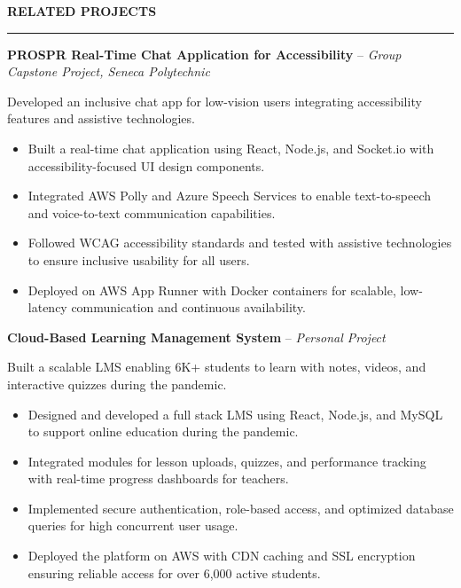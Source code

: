 \documentclass[10pt,letterpaper]{article}
\begin{document}
\vspace{6pt}

\textbf{RELATED PROJECTS}\\[-8pt]
\noindent\rule{\textwidth}{1pt}

\vspace{-2pt}

\textbf{PROSPR  Real-Time Chat Application for Accessibility} -- \emph{Group Capstone Project, Seneca Polytechnic}

\vspace{-1pt}

Developed an inclusive chat app for low-vision users integrating accessibility features and assistive technologies.
\vspace{-1pt}
\begin{itemize}
\item Built a real-time chat application using React, Node.js, and Socket.io with accessibility-focused UI design components.
\item Integrated AWS Polly and Azure Speech Services to enable text-to-speech and voice-to-text communication capabilities.
\item Followed WCAG accessibility standards and tested with assistive technologies to ensure inclusive usability for all users.
\item Deployed on AWS App Runner with Docker containers for scalable, low-latency communication and continuous availability.
\end{itemize}

\textbf{Cloud-Based Learning Management System} -- \emph{Personal Project}

\vspace{-1pt}

Built a scalable LMS enabling 6K+ students to learn with notes, videos, and interactive quizzes during the pandemic.
\vspace{-1pt}
\begin{itemize}
\item Designed and developed a full stack LMS using React, Node.js, and MySQL to support online education during the pandemic.
\item Integrated modules for lesson uploads, quizzes, and performance tracking with real-time progress dashboards for teachers.
\item Implemented secure authentication, role-based access, and optimized database queries for high concurrent user usage.
\item Deployed the platform on AWS with CDN caching and SSL encryption ensuring reliable access for over 6,000 active students.
\end{itemize}
\end{document}
